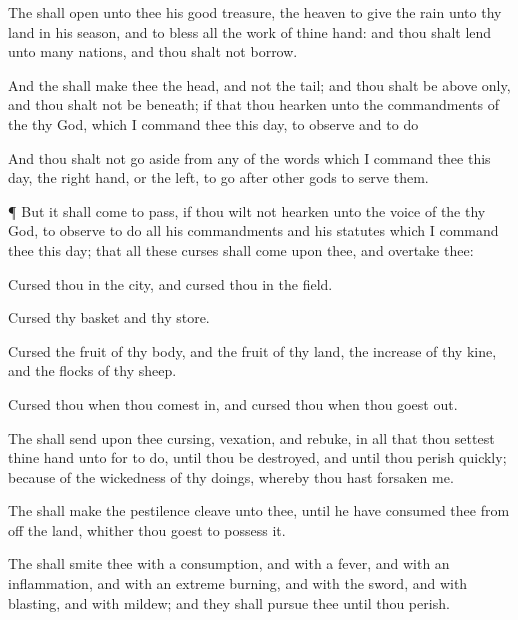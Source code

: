 {The
{} shall
open unto thee his
good
treasure, the
heaven to
give the
rain unto thy
land in his
season, and to
bless all the
work of thine
hand: and thou shalt
lend unto
many
nations, and thou shalt not
borrow.

And the
{} shall
make thee the
head, and not the
tail; and thou shalt be above
only, and thou shalt not be
beneath; if that thou
hearken unto the
commandments of the
{} thy
God, which I
command thee this
day, to
observe and to
do
{}

And thou shalt not go
aside from any of the
words which I
command thee this
day,
{} the right
hand, or
{} the
left, to
go
after
other
gods to
serve them.


\par }{\PP {}¶ But it shall come to pass, if thou wilt not
hearken unto the
voice of the
{} thy
God, to
observe to
do all his
commandments and his
statutes which I
command thee this
day; that all these
curses shall
come upon thee, and
overtake thee:

Cursed
{} thou
{} in the
city, and
cursed
{} thou
{} in the
field.

Cursed
{} thy
basket and thy
store.

Cursed
{} the
fruit of thy
body, and the
fruit of thy
land, the
increase of thy
kine, and the
flocks of thy
sheep.

Cursed
{} thou
{} when thou comest
in, and
cursed
{} thou
{} when thou goest
out.

The
{} shall
send upon thee
cursing,
vexation, and
rebuke, in all that thou
settest thine
hand unto for to
do, until thou be
destroyed, and until thou
perish
quickly;
because of the
wickedness of thy
doings, whereby thou hast
forsaken me.

The
{} shall make the
pestilence
cleave unto thee, until he have
consumed thee from off the
land, whither thou
goest to
possess it.

The
{} shall
smite thee with a
consumption, and with a
fever, and with an
inflammation, and with an extreme
burning, and with the
sword, and with
blasting, and with
mildew; and they shall
pursue thee until thou
perish.

}
